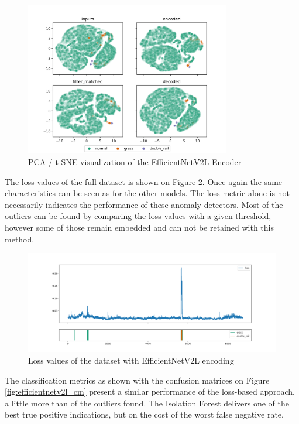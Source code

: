 \begin{figure}[H]
    \centering
    \includegraphics[width=0.8\textwidth,trim={0 0 0 1cm},clip]{./results/efficientnetv2l_vgg19/20230525_194238_feature_vectors_1.png}
    \caption{PCA / t-SNE visualization of the EfficientNetV2L Encoder}
    \label{fig:efficientnetv2l_pca}
\end{figure}

The loss values of the full dataset is shown on Figure \ref{fig:efficientnetv2l_loss}.
Once again the same characteristics can be seen as for the other models.
The loss metric alone is not necessarily indicates the performance of these anomaly detectors.
Most of the outliers can be found by comparing the loss values with a given threshold,
however some of those remain embedded and can not be retained with this method.

\begin{figure}[H]
    \centering
    \includegraphics[width=\textwidth,trim={0 1cm 0 1cm},clip]{./results/efficientnetv2l_vgg19/20230525_194238_feature_vectors_loss.png}
    \caption{Loss values of the dataset with EfficientNetV2L encoding}
    \label{fig:efficientnetv2l_loss}
\end{figure}

The classification metrics as shown with the confusion matrices on Figure \ref{fig:efficientnetv2l_cm}
present a similar performance of the loss-based approach,
a little more than \small {} of the outliers found.
The Isolation Forest delivers one of the best true positive indications,
but on the cost of the worst false negative rate.

